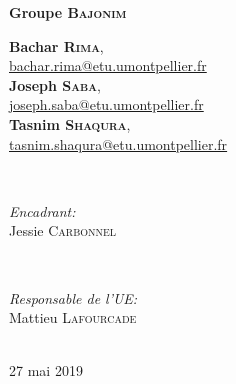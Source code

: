 \documentclass[12pt,a4paper]{report}
\theoremstyle{definition}
\begin{document}
\begin{titlepage}
{ \huge \bfseries Groupe \textsc{Bajonim}}\\[0.4cm]
\begin{minipage}{0.4\textwidth}
\centering \small
\textbf{Bachar \textsc{Rima}}, \\ \href{mailto:bachar.rima@etu.umontpellier.fr}{bachar.rima@etu.umontpellier.fr}\\ %
\textbf{Joseph \textsc{Saba}}, \\ \href{mailto:joseph.saba@etu.umontpellier.fr}{joseph.saba@etu.umontpellier.fr}\\ %
\textbf{Tasnim \textsc{Shaqura}}, \\ \href{mailto:tasnim.shaqura@etu.umontpellier.fr}{tasnim.shaqura@etu.umontpellier.fr}\\ %
\end{minipage} \\[0.8cm]

\begin{minipage}[b]{0.4\textwidth}
\begin{flushleft} \large
\emph{Encadrant:} \\
Jessie \textsc{Carbonnel} %
\end{flushleft}
\end{minipage}
~
\begin{minipage}[b]{0.4\textwidth}
\begin{flushright} \large
\emph{Responsable de l'UE:} \\
Mattieu \textsc{Lafourcade} %
\end{flushright}
\end{minipage}\\[1.5cm]

{\large 27 mai 2019}\\[1cm]
\hspace{\fill}
\vfill %
\end{titlepage}

\tableofcontents
\cleardoublepage
\end{document}
